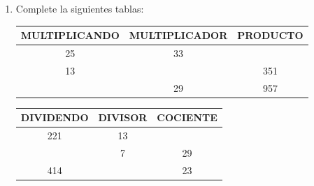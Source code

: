 \documentclass[letterpaper,fleqn]{article}
\begin{document}
\begin{enumerate}
\begin{enumerate}
    Si en la venta en bodega de cada artículo se gana lo siguiente:
    \begin{multicols}{2}
      Por cada corbata \$900\\
      Por cada par de medias \$250\\
      Por cada bufanda \$650\\
      Por cada chaqueta \$4500
    \end{multicols}
    \item ¿Cuál es el valor total de la ganancia?\noanswer
  \end{enumerate}
  \item Complete la siguientes tablas:\\
  \begin{minipage}{0.5\textwidth}
    \begin{tabular}{|c|c|c|}\hline
    MULTIPLICANDO & MULTIPLICADOR & PRODUCTO\\\hline
    25 & 33 &\\\hline
    13 & & 351\\\hline
    & 29 & 957\\\hline
  \end{tabular}
  \end{minipage}
  \hfill \begin{minipage}{0.4\textwidth}
     \begin{tabular}{|c|c|c|}\hline
  DIVIDENDO & DIVISOR & COCIENTE\\\hline
  221 & 13 & \\\hline
   & 7 & 29 \\\hline
   414 & & 23\\\hline
  \end{tabular}
  \end{minipage}
 
\end{enumerate}
\end{document}

